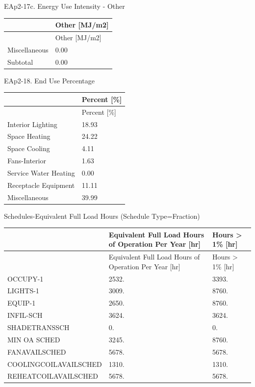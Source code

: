 EAp2-17c. Energy Use Intensity - Other

\begin{longtable}[c]{@{}ll@{}}
\toprule
 & Other [MJ/m2] \tabularnewline
\midrule
\endfirsthead

\toprule
 & Other [MJ/m2] \tabularnewline
\midrule
\endhead

Miscellaneous & 0.00 \tabularnewline
Subtotal & 0.00 \tabularnewline
\bottomrule
\end{longtable}

EAp2-18. End Use Percentage

\begin{longtable}[c]{@{}ll@{}}
\toprule
 & Percent [\%] \tabularnewline
\midrule
\endfirsthead

\toprule
 & Percent [\%] \tabularnewline
\midrule
\endhead

Interior Lighting & 18.93 \tabularnewline
Space Heating & 24.22 \tabularnewline
Space Cooling & 4.11 \tabularnewline
Fans-Interior & 1.63 \tabularnewline
Service Water Heating & 0.00 \tabularnewline
Receptacle Equipment & 11.11 \tabularnewline
Miscellaneous & 39.99 \tabularnewline
\bottomrule
\end{longtable}

Schedules-Equivalent Full Load Hours (Schedule Type=Fraction)
\begin{longtable}[c]{@{}lll@{}}

\toprule
 & Equivalent Full Load Hours of Operation Per Year [hr] & Hours > 1\% [hr] \tabularnewline
\midrule
\endfirsthead

\toprule
 & Equivalent Full Load Hours of Operation Per Year [hr] & Hours > 1\% [hr] \tabularnewline
\midrule
\endhead

    OCCUPY-1              &        2532.                                          &        3393.     \tabularnewline
    LIGHTS-1              &        3009.                                          &        8760.     \tabularnewline
    EQUIP-1               &        2650.                                          &        8760.     \tabularnewline
    INFIL-SCH             &        3624.                                          &        3624.     \tabularnewline
    SHADETRANSSCH         &           0.                                          &           0.     \tabularnewline
    MIN OA SCHED          &        3245.                                          &        8760.     \tabularnewline
    FANAVAILSCHED         &        5678.                                          &        5678.     \tabularnewline
    COOLINGCOILAVAILSCHED &        1310.                                          &        1310.     \tabularnewline
    REHEATCOILAVAILSCHED  &        5678.                                          &        5678.     \tabularnewline

\bottomrule
\end{longtable}

